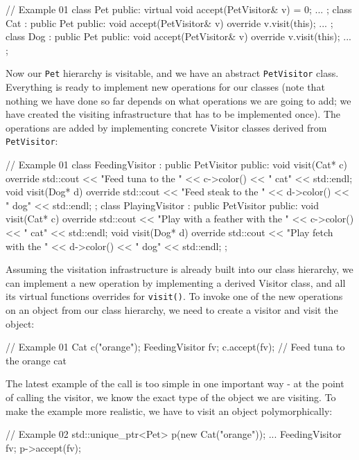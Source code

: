 \begin{code}
// Example 01
class Pet {
  public:
  virtual void accept(PetVisitor& v) = 0;
  ...
};
class Cat : public Pet {
  public:
  void accept(PetVisitor& v) override { v.visit(this); }
  ...
};
class Dog : public Pet {
  public:
  void accept(PetVisitor& v) override { v.visit(this); }
  ...
};
\end{code}

Now our \texttt{Pet} hierarchy is visitable, and we have an abstract \texttt{PetVisitor} class. Everything is ready to implement new operations for our classes (note that nothing we have done so far depends on what operations we are going to add; we have created the visiting infrastructure that has to be implemented once). The operations are added by implementing concrete Visitor classes derived from \texttt{PetVisitor}:

\begin{code}
// Example 01
class FeedingVisitor : public PetVisitor {
  public:
  void visit(Cat* c) override {
    std::cout << "Feed tuna to the " << c->color()
              << " cat" << std::endl;
  }
  void visit(Dog* d) override {
    std::cout << "Feed steak to the " << d->color()
              << " dog" << std::endl;
  }
};
class PlayingVisitor : public PetVisitor {
  public:
  void visit(Cat* c) override {
    std::cout << "Play with a feather with the "
              << c->color() << " cat" << std::endl;
  }
  void visit(Dog* d) override {
    std::cout << "Play fetch with the " << d->color()
              << " dog" << std::endl;
  }
};
\end{code}

Assuming the visitation infrastructure is already built into our class hierarchy, we can implement a new operation by implementing a derived Visitor class, and all its virtual functions overrides for \texttt{visit()}. To invoke one of the new operations on an object from our class hierarchy, we need to create a visitor and visit the object:

\begin{code}
// Example 01
Cat c("orange");
FeedingVisitor fv;
c.accept(fv); // Feed tuna to the orange cat
\end{code}

The latest example of the call is too simple in one important way - at the point of calling the visitor, we know the exact type of the object we are visiting. To make the example more realistic, we have to visit an object polymorphically:

\begin{code}
// Example 02
std::unique_ptr<Pet> p(new Cat("orange"));
...
FeedingVisitor fv;
p->accept(fv);
\end{code}

